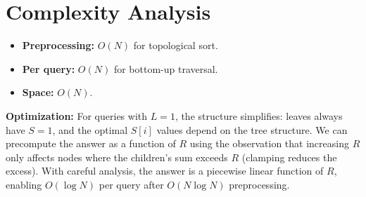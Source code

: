 \documentclass[11pt,a4paper]{article}
\begin{document}
\section{Complexity Analysis}
\begin{itemize}
  \item \textbf{Preprocessing:} $O(N)$ for topological sort.
  \item \textbf{Per query:} $O(N)$ for bottom-up traversal.
  \item \textbf{Space:} $O(N)$.
\end{itemize}

\textbf{Optimization:} For queries with $L = 1$, the structure simplifies: leaves always have $S = 1$, and the optimal $S[i]$ values depend on the tree structure. We can precompute the answer as a function of $R$ using the observation that increasing $R$ only affects nodes where the children's sum exceeds $R$ (clamping reduces the excess). With careful analysis, the answer is a piecewise linear function of $R$, enabling $O(\log N)$ per query after $O(N \log N)$ preprocessing.
\end{document}
